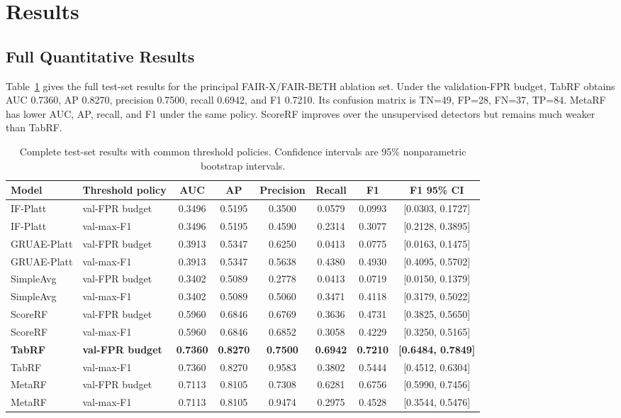 \documentclass[10pt,journal,compsoc]{IEEEtran}
\begin{document}
\section{Results}
\label{sec:results}

\subsection{Full Quantitative Results}

Table~\ref{tab:full_results} gives the full test-set results for the principal FAIR-X/FAIR-BETH ablation set. Under the validation-FPR budget, TabRF obtains AUC 0.7360, AP 0.8270, precision 0.7500, recall 0.6942, and F1 0.7210. Its confusion matrix is TN=49, FP=28, FN=37, TP=84. MetaRF has lower AUC, AP, recall, and F1 under the same policy. ScoreRF improves over the unsupervised detectors but remains much weaker than TabRF.

\begin{table}[t]
\centering
\caption{Complete test-set results with common threshold policies. Confidence intervals are 95\% nonparametric bootstrap intervals.}
\label{tab:full_results}
\begin{tabular}{llcccccc}
\toprule
\textbf{Model} & \textbf{Threshold policy} & \textbf{AUC} & \textbf{AP} & \textbf{Precision} & \textbf{Recall} & \textbf{F1} & \textbf{F1 95\% CI} \\
\midrule
IF-Platt & val-FPR budget & 0.3496 & 0.5195 & 0.3500 & 0.0579 & 0.0993 & [0.0303, 0.1727] \\
IF-Platt & val-max-F1 & 0.3496 & 0.5195 & 0.4590 & 0.2314 & 0.3077 & [0.2128, 0.3895] \\
GRUAE-Platt & val-FPR budget & 0.3913 & 0.5347 & 0.6250 & 0.0413 & 0.0775 & [0.0163, 0.1475] \\
GRUAE-Platt & val-max-F1 & 0.3913 & 0.5347 & 0.5638 & 0.4380 & 0.4930 & [0.4095, 0.5702] \\
SimpleAvg & val-FPR budget & 0.3402 & 0.5089 & 0.2778 & 0.0413 & 0.0719 & [0.0150, 0.1379] \\
SimpleAvg & val-max-F1 & 0.3402 & 0.5089 & 0.5060 & 0.3471 & 0.4118 & [0.3179, 0.5022] \\
ScoreRF & val-FPR budget & 0.5960 & 0.6846 & 0.6769 & 0.3636 & 0.4731 & [0.3825, 0.5650] \\
ScoreRF & val-max-F1 & 0.5960 & 0.6846 & 0.6852 & 0.3058 & 0.4229 & [0.3250, 0.5165] \\
\textbf{TabRF} & \textbf{val-FPR budget} & \textbf{0.7360} & \textbf{0.8270} & \textbf{0.7500} & \textbf{0.6942} & \textbf{0.7210} & \textbf{[0.6484, 0.7849]} \\
TabRF & val-max-F1 & 0.7360 & 0.8270 & 0.9583 & 0.3802 & 0.5444 & [0.4512, 0.6304] \\
MetaRF & val-FPR budget & 0.7113 & 0.8105 & 0.7308 & 0.6281 & 0.6756 & [0.5990, 0.7456] \\
MetaRF & val-max-F1 & 0.7113 & 0.8105 & 0.9474 & 0.2975 & 0.4528 & [0.3544, 0.5476] \\
\bottomrule
\end{tabular}
\end{table}
\end{document}
